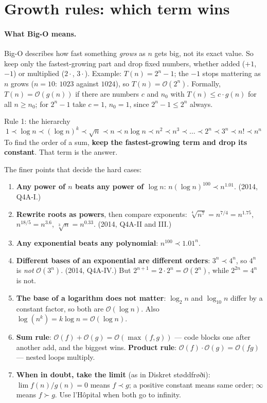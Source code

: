 \documentclass{fkt-notes}
\newcommand{\Oh}{\mathcal{O}}
\begin{document}
\section{Growth rules: which term wins}
\label{sec:growth}

\paragraph{What Big-O means.} Big-O describes how fast something \emph{grows} as $n$ gets big, not its exact value. So keep only the fastest-growing part and drop fixed numbers, whether added ($+1$, $-1$) or multiplied ($2\cdot$, $3\cdot$). Example: $T(n)=2^n-1$; the $-1$ stops mattering as $n$ grows ($n=10$: $1023$ against $1024$), so $T(n)=\Oh(2^n)$. Formally, $T(n)=\Oh(g(n))$ if there are numbers $c$ and $n_0$ with $T(n)\le c\cdot g(n)$ for all $n\ge n_0$; for $2^n-1$ take $c=1$, $n_0=1$, since $2^n-1\le 2^n$ always.

\begin{rulebox}{Rule 1: the hierarchy}
\[
1 \prec \log n \prec (\log n)^k \prec \sqrt n \prec n \prec n\log n \prec n^2 \prec n^3 \prec \dots \prec 2^n \prec 3^n \prec n! \prec n^n
\]
To find the order of a sum, \textbf{keep the fastest-growing term and drop its constant}. That term is the answer.
\end{rulebox}

The finer points that decide the hard cases:
\begin{enumerate}[leftmargin=2em]
  \item \textbf{Any power of $n$ beats any power of $\log n$}: $n(\log n)^{100}\prec n^{1.01}$. (2014, Q4A-I.)
  \item \textbf{Rewrite roots as powers}, then compare exponents: $\sqrt[4]{n^7}=n^{7/4}=n^{1.75}$, $n^{18/5}=n^{3.6}$, $\sqrt[3]{n}=n^{0.33}$. (2014, Q4A-II and III.)
  \item \textbf{Any exponential beats any polynomial}: $n^{100}\prec 1.01^n$.
  \item \textbf{Different bases of an exponential are different orders}: $3^n\prec4^n$, so $4^n$ is \emph{not} $\Oh(3^n)$. (2014, Q4A-IV.) But $2^{n+1}=2\cdot2^n=\Oh(2^n)$, while $2^{2n}=4^n$ is not.
  \item \textbf{The base of a logarithm does not matter}: $\log_2 n$ and $\log_{10}n$ differ by a constant factor, so both are $\Oh(\log n)$. Also $\log(n^k)=k\log n=\Oh(\log n)$.
  \item \textbf{Sum rule}: $\Oh(f)+\Oh(g)=\Oh(\max(f,g))$ --- code blocks one after another add, and the biggest wins. \textbf{Product rule}: $\Oh(f)\cdot\Oh(g)=\Oh(fg)$ --- nested loops multiply.
  \item \textbf{When in doubt, take the limit} (as in Diskret støddfrøði): $\lim f(n)/g(n)=0$ means $f\prec g$; a positive constant means same order; $\infty$ means $f\succ g$. Use l'Hôpital when both go to infinity.
\end{enumerate}
\end{document}
